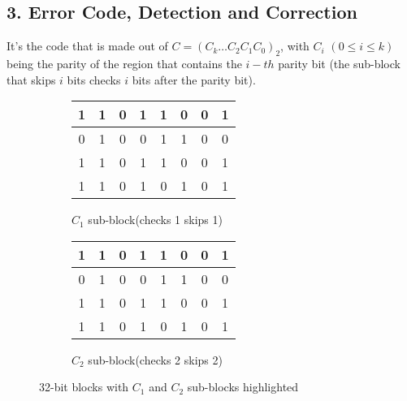 \documentclass[11pt]{article}
\begin{document}
\subsection*{3. Error Code, Detection and Correction}
It's the code that is made out of $C = (C_k \ldots C_2 C_1 C_0)_2$, with $C_i$ $(0\leq i \leq k)$ being the parity of the region that contains the $i-th$ parity bit (the sub-block that skips $i$ bits checks $i$ bits after the parity bit).

\begin{figure}[H]
    \centering
    \begin{subfigure}[b]{0.4\textwidth}
        \centering
        \begin{tabular}{|c|c|c|c|c|c|c|c|}
            \hline
            1 & \cellcolor{blue!50}1 & 0 & \cellcolor{black!30}1 & 1 & \cellcolor{black!30}0 & 0 & \cellcolor{black!30}1 \\
            \hline
            0 & \cellcolor{black!30}1 & 0 & \cellcolor{black!30}0 & 1 & \cellcolor{black!30}1 & 0 & \cellcolor{black!30}0 \\
            \hline
            1 & \cellcolor{black!30}1 & 0 & \cellcolor{black!30}1 & 1 & \cellcolor{black!30}0 & 0 & \cellcolor{black!30}1 \\
            \hline
            1 & \cellcolor{black!30}1 & 0 & \cellcolor{black!30}1 & 0 & \cellcolor{black!30}1 & 0 & \cellcolor{black!30}1 \\
            \hline
        \end{tabular}
        \caption{$C_1$ sub-block(checks 1 skips 1)}
    \end{subfigure}
    \begin{subfigure}[b]{0.4\textwidth}
        \centering
        \begin{tabular}{|c|c|c|c|c|c|c|c|}
            \hline
            1 & 1 & \cellcolor{blue!50}0 & \cellcolor{black!30}1 & 1 & 0 & \cellcolor{black!30}0 & \cellcolor{black!30}1 \\
            \hline
            0 & 1 & \cellcolor{black!30}0 & \cellcolor{black!30}0 & 1 & 1 & \cellcolor{black!30}0 & \cellcolor{black!30}0 \\
            \hline
            1 & 1 & \cellcolor{black!30}0 & \cellcolor{black!30}1 & 1 & 0 & \cellcolor{black!30}0 & \cellcolor{black!30}1 \\
            \hline
            1 & 1 & \cellcolor{black!30}0 & \cellcolor{black!30}1 & 0 & 1 & \cellcolor{black!30}0 & \cellcolor{black!30}1 \\
            \hline
        \end{tabular}
        \caption{$C_2$ sub-block(checks 2 skips 2)}
    \end{subfigure}
    \caption{32-bit blocks with $C_1$ and $C_2$ sub-blocks highlighted}
    \label{fig:32bit_hamming}
\end{figure}
\end{document}
